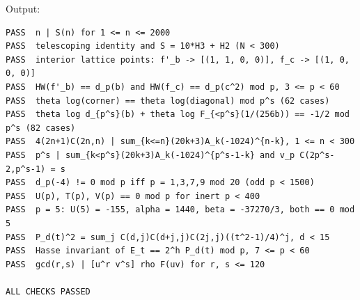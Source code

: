 \documentclass[11pt]{amsart}
\theoremstyle{definition}
\theoremstyle{remark}
\begin{document}
\noindent Output:
\begin{lstlisting}
PASS  n | S(n) for 1 <= n <= 2000
PASS  telescoping identity and S = 10*H3 + H2 (N < 300)
PASS  interior lattice points: f'_b -> [(1, 1, 0, 0)], f_c -> [(1, 0, 0, 0)]
PASS  HW(f'_b) == d_p(b) and HW(f_c) == d_p(c^2) mod p, 3 <= p < 60
PASS  theta log(corner) == theta log(diagonal) mod p^s (62 cases)
PASS  theta log d_{p^s}(b) + theta log F_{<p^s}(1/(256b)) == -1/2 mod p^s (82 cases)
PASS  4(2n+1)C(2n,n) | sum_{k<=n}(20k+3)A_k(-1024)^{n-k}, 1 <= n < 300
PASS  p^s | sum_{k<p^s}(20k+3)A_k(-1024)^{p^s-1-k} and v_p C(2p^s-2,p^s-1) = s
PASS  d_p(-4) != 0 mod p iff p = 1,3,7,9 mod 20 (odd p < 1500)
PASS  U(p), T(p), V(p) == 0 mod p for inert p < 400
PASS  p = 5: U(5) = -155, alpha = 1440, beta = -37270/3, both == 0 mod 5
PASS  P_d(t)^2 = sum_j C(d,j)C(d+j,j)C(2j,j)((t^2-1)/4)^j, d < 15
PASS  Hasse invariant of E_t == 2^h P_d(t) mod p, 7 <= p < 60
PASS  gcd(r,s) | [u^r v^s] rho F(uv) for r, s <= 120

ALL CHECKS PASSED
\end{lstlisting}
\end{document}
